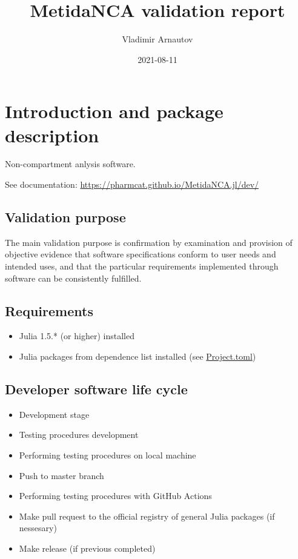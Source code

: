 \documentclass[12pt,a4paper]{article}
\title{ MetidaNCA validation report }
\author{ Vladimir Arnautov }
\date{ 2021-08-11 }
\begin{document}
\maketitle


\section{Introduction and package description}
Non-compartment anlysis software.

See documentation: \href{https://pharmcat.github.io/MetidaNCA.jl/dev/}{https://pharmcat.github.io/MetidaNCA.jl/dev/}

\subsection{Validation purpose}
The main validation purpose is confirmation by examination and provision of objective evidence that software specifications conform to user needs and intended uses, and that the particular requirements implemented through software can be consistently fulfilled.

\subsection{Requirements}
\begin{itemize}
\item Julia 1.5.* (or higher) installed


\item Julia packages from dependence list installed (see \href{https://github.com/PharmCat/MetidaNCA.jl/blob/main/Project.toml}{Project.toml})

\end{itemize}
\subsection{Developer software life cycle}
\begin{itemize}
\item Development stage


\item Testing procedures development


\item Performing testing procedures on local machine


\item Push to master branch


\item Performing testing procedures with GitHub Actions


\item Make pull request to the official registry of general Julia packages (if nessesary)


\item Make release (if previous completed)

\end{itemize}
\end{document}
